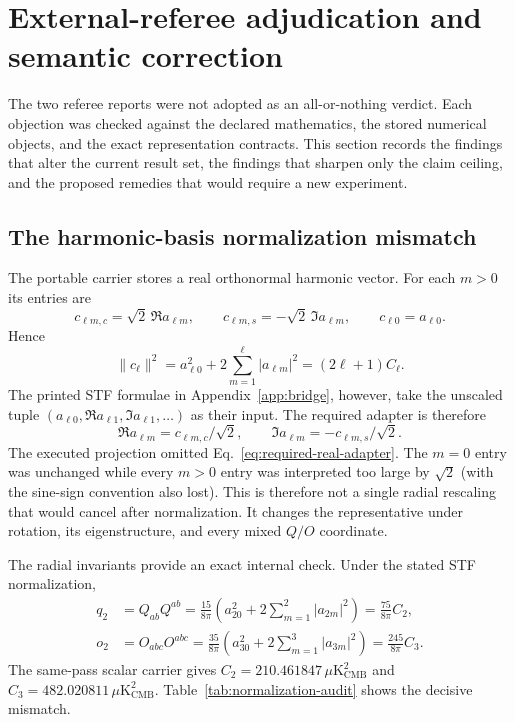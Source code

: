 \documentclass[11pt,a4paper]{article}
\newcommand{\microK}{\mu\mathrm{K}_{\mathrm{CMB}}}
\begin{document}
\section{External-referee adjudication and semantic correction}
\label{sec:external-correction}

The two referee reports were not adopted as an all-or-nothing verdict.  Each
objection was checked against the declared mathematics, the stored numerical
objects, and the exact representation contracts.  This section records the
findings that alter the current result set, the findings that sharpen only the
claim ceiling, and the proposed remedies that would require a new experiment.

\subsection{The harmonic-basis normalization mismatch}

The portable carrier stores a real orthonormal harmonic vector.  For each
$m>0$ its entries are
\begin{equation}
c_{\ell m,c}=\sqrt2\,\Re a_{\ell m},
\qquad
c_{\ell m,s}=-\sqrt2\,\Im a_{\ell m},
\qquad c_{\ell0}=a_{\ell0}.
\label{eq:real-carrier-convention}
\end{equation}
Hence
\begin{equation}
\|c_\ell\|^2
=a_{\ell0}^2+2\sum_{m=1}^{\ell}|a_{\ell m}|^2
=(2\ell+1)C_\ell.
\label{eq:real-carrier-power}
\end{equation}
The printed STF formulae in Appendix~\ref{app:bridge}, however, take the
unscaled tuple
$(a_{\ell0},\Re a_{\ell1},\Im a_{\ell1},\ldots)$ as their input.  The required
adapter is therefore
\begin{equation}
\Re a_{\ell m}=c_{\ell m,c}/\sqrt2,
\qquad
\Im a_{\ell m}=-c_{\ell m,s}/\sqrt2.
\label{eq:required-real-adapter}
\end{equation}
The executed projection omitted Eq.~\eqref{eq:required-real-adapter}.  The
$m=0$ entry was unchanged while every $m>0$ entry was interpreted too large by
$\sqrt2$ (with the sine-sign convention also lost).  This is therefore not a
single radial rescaling that would cancel after normalization.  It changes the
representative under rotation, its eigenstructure, and every mixed $Q/O$
coordinate.

The radial invariants provide an exact internal check.  Under the stated STF
normalization,
\begin{align}
q_2&=Q_{ab}Q^{ab}
=\frac{15}{8\pi}\left(a_{20}^2+2\sum_{m=1}^{2}|a_{2m}|^2\right)
=\frac{75}{8\pi}C_2,
\label{eq:q2-cl-identity}\\
o_2&=O_{abc}O^{abc}
=\frac{35}{8\pi}\left(a_{30}^2+2\sum_{m=1}^{3}|a_{3m}|^2\right)
=\frac{245}{8\pi}C_3.
\label{eq:o2-cl-identity}
\end{align}
The same-pass scalar carrier gives
$C_2=210.461847\,\microK^2$ and
$C_3=482.020811\,\microK^2$.  Table~\ref{tab:normalization-audit} shows the
decisive mismatch.
\end{document}
